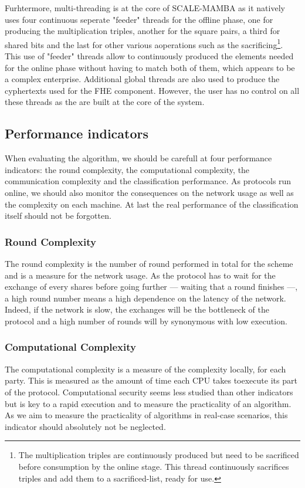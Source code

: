 Furhtermore, multi-threading is at the core of SCALE-MAMBA as it natively uses four continuous seperate "feeder" threads for the offline phase, one for producing the multiplication triples, another for the square pairs, a third for shared bits and the last for other various aoperations such as the sacrificing\footnote{The multiplication triples are continuously produced but need to be sacrificed before consumption by the online stage. This thread continuously sacrifices triples and add them to a sacrificed-list, ready for use.}. This use of "feeder" threads allow to continuously produced the elements needed for the online phase without having to match both of them, which appears to be a complex enterprise. Additional global threads are also used to produce the cyphertexts used for the FHE component. However, the user has no control on all these threads as the are built at the core of the system.

\subsection{Performance indicators}
When evaluating the algorithm, we should be carefull at four performance indicators: the round complexity, the computational complexity, the communication complexity and the classification performance. As protocols run online, we should also monitor the consequences on the network usage as well as the complexity on each machine. At last the real performance of the classification itself should not be forgotten. 

\subsubsection{Round Complexity}
The round complexity is the number of round performed in total for the scheme and is a measure for the network usage. As the protocol has to wait for the exchange of every shares before going further --- waiting that a round finishes ---, a high round number means a high dependence on the latency of the network. Indeed, if the network is slow, the exchanges will be the bottleneck of the protocol and a high number of rounds will by synonymous with low execution.

\subsubsection{Computational Complexity}
The computational complexity is a measure of the complexity locally, for each party. This is measured as the amount of time each CPU takes toexecute its part of the protocol. Computational security seems less studied than other indicators \cite{Blom2014AThesis} but is key to a rapid execution and to measure the practicality of an algorithm. As we aim to measure the practicality of algorithms in real-case scenarios, this indicator should absolutely not be neglected.


